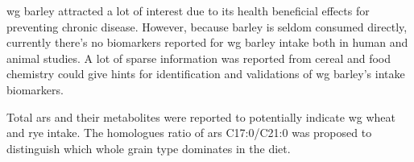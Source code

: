 \acrshort{wg} barley attracted a lot of interest due to its health beneficial effects for preventing chronic disease. However, because barley is seldom consumed directly, currently there's no biomarkers reported for \acrshort{wg} barley intake both in human and animal studies. A lot of sparse information was reported from cereal and food chemistry could give hints for identification and validations of \acrshort{wg} barley's intake biomarkers.

Total \acrshort{ars} and their metabolites were reported to potentially indicate \acrshort{wg} wheat and rye intake. The homologues ratio of \acrshort{ars} C17:0/C21:0 was proposed to distinguish which whole grain type dominates in the diet. 